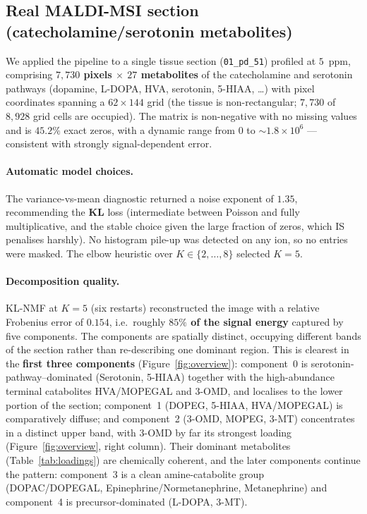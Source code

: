 \documentclass[11pt]{article}
\newcommand{\code}[1]{\texttt{#1}}
\begin{document}
\subsection{Real MALDI-MSI section (catecholamine/serotonin metabolites)}
\label{sec:realdata}

We applied the pipeline to a single tissue section (\code{01\_pd\_51}) profiled at $5$~ppm,
comprising \textbf{$7{,}730$ pixels $\times$ $27$ metabolites} of the catecholamine and
serotonin pathways (dopamine, L-DOPA, HVA, serotonin, 5-HIAA, \ldots) with pixel coordinates
spanning a $62 \times 144$ grid (the tissue is non-rectangular; $7{,}730$ of $8{,}928$ grid
cells are occupied). The matrix is non-negative with no missing values and is $45.2\%$ exact
zeros, with a dynamic range from $0$ to ${\sim}1.8 \times 10^6$ --- consistent with strongly
signal-dependent error.

\paragraph{Automatic model choices.} The variance-vs-mean diagnostic returned a noise
exponent of \textbf{$1.35$}, recommending the \textbf{KL} loss (intermediate between Poisson
and fully multiplicative, and the stable choice given the large fraction of zeros, which IS
penalises harshly). No histogram pile-up was detected on any ion, so no entries were masked.
The elbow heuristic over $K \in \{2,\ldots,8\}$ selected \textbf{$K = 5$}.

\paragraph{Decomposition quality.} KL-NMF at $K = 5$ (six restarts) reconstructed the image
with a relative Frobenius error of \textbf{$0.154$}, i.e.\ roughly \textbf{$85\%$ of the
signal energy} captured by five components. The components are spatially distinct, occupying
different bands of the section rather than re-describing one dominant region. This is
clearest in the \textbf{first three components} (Figure~\ref{fig:overview}): component~0 is
serotonin-pathway--dominated (Serotonin, 5-HIAA) together with the high-abundance terminal
catabolites HVA/MOPEGAL and 3-OMD, and localises to the lower portion of the section;
component~1 (DOPEG, 5-HIAA, HVA/MOPEGAL) is comparatively diffuse; and component~2 (3-OMD,
MOPEG, 3-MT) concentrates in a distinct upper band, with 3-OMD by far its strongest loading
(Figure~\ref{fig:overview}, right column). Their dominant metabolites
(Table~\ref{tab:loadings}) are chemically coherent, and the later components continue the
pattern: component~3 is a clean amine-catabolite group (DOPAC/DOPEGAL,
Epinephrine/Normetanephrine, Metanephrine) and component~4 is precursor-dominated
(L-DOPA, 3-MT).
\end{document}
